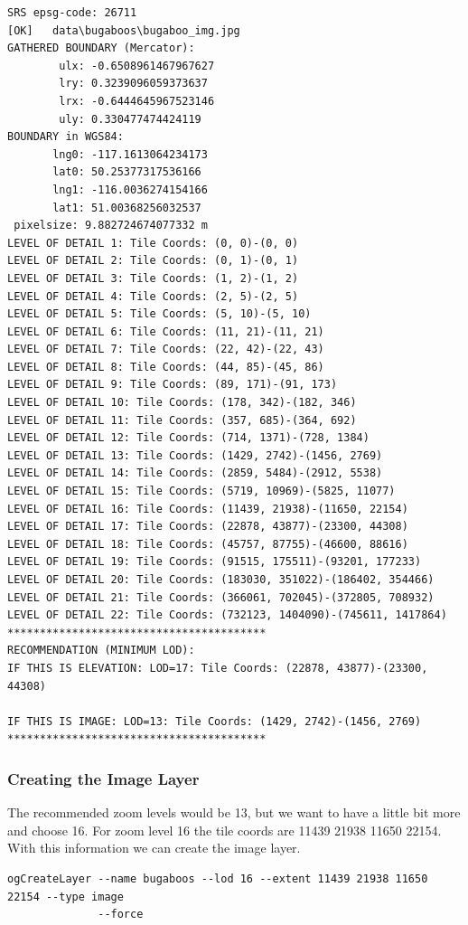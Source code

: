 \documentclass[
	12pt,
	a4paper,
	english,	
	appendixprefix,				     			        
	openany,		     	
	abstracton,		    		    
 	BCOR8mm,		    
]{scrartcl}
\begin{document}
\begin{lstlisting}
SRS epsg-code: 26711
[OK]   data\bugaboos\bugaboo_img.jpg
GATHERED BOUNDARY (Mercator):
        ulx: -0.6508961467967627
        lry: 0.3239096059373637
        lrx: -0.6444645967523146
        uly: 0.330477474424119
BOUNDARY in WGS84:
       lng0: -117.1613064234173
       lat0: 50.25377317536166
       lng1: -116.0036274154166
       lat1: 51.00368256032537
 pixelsize: 9.882724674077332 m
LEVEL OF DETAIL 1: Tile Coords: (0, 0)-(0, 0)
LEVEL OF DETAIL 2: Tile Coords: (0, 1)-(0, 1)
LEVEL OF DETAIL 3: Tile Coords: (1, 2)-(1, 2)
LEVEL OF DETAIL 4: Tile Coords: (2, 5)-(2, 5)
LEVEL OF DETAIL 5: Tile Coords: (5, 10)-(5, 10)
LEVEL OF DETAIL 6: Tile Coords: (11, 21)-(11, 21)
LEVEL OF DETAIL 7: Tile Coords: (22, 42)-(22, 43)
LEVEL OF DETAIL 8: Tile Coords: (44, 85)-(45, 86)
LEVEL OF DETAIL 9: Tile Coords: (89, 171)-(91, 173)
LEVEL OF DETAIL 10: Tile Coords: (178, 342)-(182, 346)
LEVEL OF DETAIL 11: Tile Coords: (357, 685)-(364, 692)
LEVEL OF DETAIL 12: Tile Coords: (714, 1371)-(728, 1384)
LEVEL OF DETAIL 13: Tile Coords: (1429, 2742)-(1456, 2769)
LEVEL OF DETAIL 14: Tile Coords: (2859, 5484)-(2912, 5538)
LEVEL OF DETAIL 15: Tile Coords: (5719, 10969)-(5825, 11077)
LEVEL OF DETAIL 16: Tile Coords: (11439, 21938)-(11650, 22154)
LEVEL OF DETAIL 17: Tile Coords: (22878, 43877)-(23300, 44308)
LEVEL OF DETAIL 18: Tile Coords: (45757, 87755)-(46600, 88616)
LEVEL OF DETAIL 19: Tile Coords: (91515, 175511)-(93201, 177233)
LEVEL OF DETAIL 20: Tile Coords: (183030, 351022)-(186402, 354466)
LEVEL OF DETAIL 21: Tile Coords: (366061, 702045)-(372805, 708932)
LEVEL OF DETAIL 22: Tile Coords: (732123, 1404090)-(745611, 1417864)
****************************************
RECOMMENDATION (MINIMUM LOD):
IF THIS IS ELEVATION: LOD=17: Tile Coords: (22878, 43877)-(23300, 44308)

IF THIS IS IMAGE: LOD=13: Tile Coords: (1429, 2742)-(1456, 2769)
****************************************
\end{lstlisting}

 
\subsubsection{Creating the Image Layer}

The recommended zoom levels would be 13, but we want to have a little bit more and choose 16.
For zoom level 16 the tile coords are 11439 21938 11650 22154. With this information we can create the image layer.

\begin{lstlisting}
ogCreateLayer --name bugaboos --lod 16 --extent 11439 21938 11650 22154 --type image 
              --force
\end{lstlisting}
\end{document}
